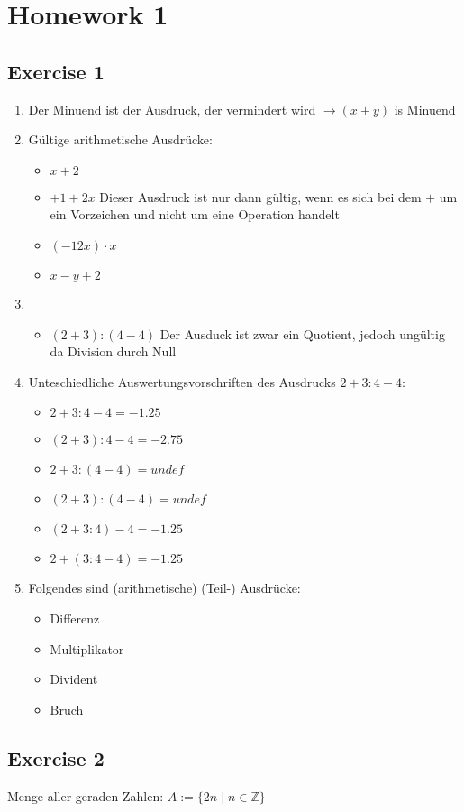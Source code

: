 \documentclass[10pt,a4paper,oneside]{report}
\author{Patrick Kalmbach}
\begin{document}
\noindent
\section{Homework 1}
\subsection{Exercise 1}
\begin{enumerate}
\item Der Minuend ist der Ausdruck, der vermindert wird $\rightarrow (x+y)$ is Minuend
\item Gültige arithmetische Ausdrücke:
	\begin{itemize}
		\item $x+2$
		\item $+1+2x$ Dieser Ausdruck ist nur dann gültig, wenn es sich bei dem $+$ um ein Vorzeichen und nicht um eine Operation handelt
		\item $(-12x)\cdot x$
		\item $x-y+2$
	\end{itemize}
\item
	\begin{itemize}
		\item $(2+3):(4-4)$ Der Ausduck ist zwar ein Quotient, jedoch ungültig da Division durch Null
	\end{itemize}
	\item Unteschiedliche Auswertungsvorschriften des Ausdrucks $2+3:4-4$:
	\begin{itemize}	
		\item $2+3:4-4=-1.25$
		\item $(2+3):4-4 = -2.75$
		\item $2+3:(4-4) = undef$
		\item $(2+3):(4-4) = undef$
		\item $(2+3:4)-4 = -1.25$
		\item $2+(3:4-4) = -1.25$
	\end{itemize}
	\item Folgendes sind (arithmetische) (Teil-) Ausdrücke:
		\begin{itemize}
			\item Differenz
			\item Multiplikator
			\item Divident
			\item Bruch
		\end{itemize}
\end{enumerate}

\subsection{Exercise 2}
Menge aller geraden Zahlen: $A:=\lbrace 2n\mid n\in\mathbb{Z}\rbrace$
\end{document}
